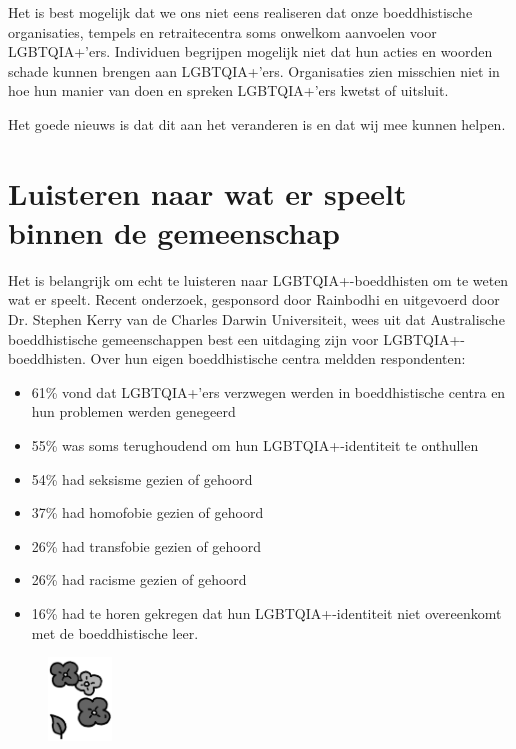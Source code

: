 \documentclass[12pt,openany]{book}
\begin{document}
Het is best mogelijk dat we ons niet eens realiseren dat onze boeddhistische organisaties, tempels en retraitecentra soms onwelkom aanvoelen voor LGBTQIA+'ers. Individuen begrijpen mogelijk niet dat hun acties en woorden schade kunnen brengen aan LGBTQIA+'ers. Organisaties zien misschien niet in hoe hun manier van doen en spreken LGBTQIA+'ers kwetst of uitsluit.  

Het goede nieuws is dat dit aan het veranderen is en dat wij mee kunnen helpen.

\section*{Luisteren naar wat er speelt binnen de gemeenschap}

Het is belangrijk om echt te luisteren naar LGBTQIA+-boeddhisten om te weten wat er speelt. Recent onderzoek, gesponsord door Rainbodhi en uitgevoerd door Dr. Stephen Kerry van de Charles Darwin Universiteit, wees uit dat Australische boeddhistische gemeenschappen best een uitdaging zijn voor LGBTQIA+-boeddhisten. Over hun eigen boeddhistische centra meldden respondenten:

\begin{itemize}
\setlength\itemsep{-0.3em}
  \item 61\% vond dat LGBTQIA+'ers verzwegen werden in boeddhistische centra en hun problemen werden genegeerd
  \item 55\% was soms terughoudend om hun LGBTQIA+-identiteit te onthullen
  \item 54\% had seksisme gezien of gehoord
  \item 37\% had homofobie gezien of gehoord
  \item 26\% had transfobie gezien of gehoord
  \item 26\% had racisme gezien of gehoord
  \item 16\% had te horen gekregen dat hun LGBTQIA+-identiteit niet overeenkomt met de boeddhistische leer.
\end{itemize}

\begin{figure}
    \centering
    \includegraphics[width=0.15\textwidth]{2bw4.png}
\end{figure}
\end{document}

